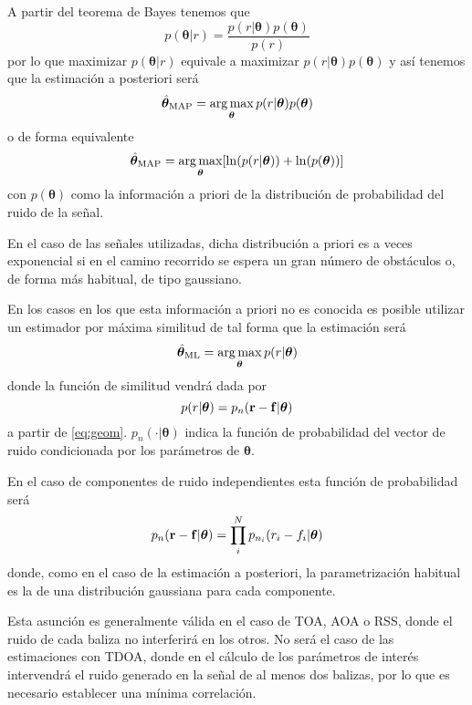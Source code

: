 A partir del teorema de Bayes tenemos que
\begin{equation}
    p(\bm{\theta}|r) = \frac{p(r|\bm{\theta})p(\bm{\theta})}{p(r)}
\end{equation}
por lo que maximizar $p(\bm{\theta}|r)$ equivale a maximizar $p(r|\bm{\theta})p(\bm{\theta})$ y así tenemos que la estimación a posteriori será \cite{Xbook}
\begin{equation}\label{eq:MAP}
    \hat{\bm{\theta}}_{\text{MAP}} = \operatorname*{arg\,max}_{\bm{\theta}} p(r|\bm{\theta})p(\bm{\theta})
\end{equation}
o de forma equivalente
\begin{equation}
    \hat{\bm{\theta}}_{\text{MAP}} = \operatorname*{arg\,max}_{\bm{\theta}} [\ln(p(r|\bm{\theta})) + \ln(p(\bm{\theta})) ]
\end{equation}
con $p(\bm{\theta})$ como la información a priori de la distribución de probabilidad del ruido de la señal.

En el caso de las señales utilizadas, dicha distribución a priori es a veces exponencial si en el camino recorrido se espera un gran número de obstáculos o, de forma más habitual, de tipo gaussiano.

En los casos en los que esta información a priori no es conocida es posible utilizar un estimador por máxima similitud de tal forma que la estimación será
\begin{equation}\label{eq:ML}
    \hat{\bm{\theta}}_{\text{ML}} = \operatorname*{arg\,max}_{\bm{\theta}} p(r|\bm{\theta})
\end{equation}
donde la función de similitud vendrá dada por
\begin{equation}
    p(r|\bm{\theta}) = p_n(\vb{r} - \vb{f}|\bm{\theta})
\end{equation}
a partir de \eqref{eq:geom}.
$p_n(\cdot | \bm{\theta})$ indica la función de probabilidad del vector de ruido condicionada por los parámetros de $\bm{\theta}$.

En el caso de componentes de ruido independientes esta función de probabilidad será
\begin{equation}
    p_n(\vb{r} - \vb{f}|\bm{\theta}) = \prod_i^{N} p_{n_i}(r_i - f_i|\bm{\theta})
\end{equation}
donde, como en el caso de la estimación a posteriori, la parametrización habitual es la de una distribución gaussiana para cada componente.

Esta asunción es generalmente válida en el caso de TOA, AOA o RSS, donde el ruido de cada baliza no interferirá en los otros.
No será el caso de las estimaciones con TDOA, donde en el cálculo de los parámetros de interés intervendrá el ruido generado en la señal de al menos dos balizas, por lo que es necesario establecer una mínima correlación.

